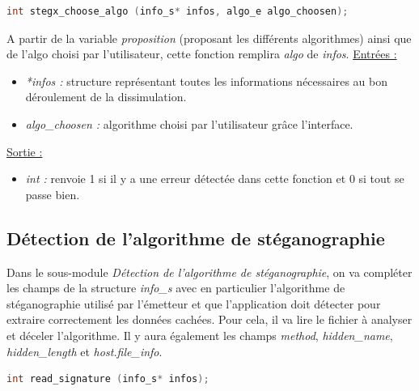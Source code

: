\documentclass[11pt]{article}
\begin{document}
\begin{lstlisting}[language=c]
int stegx_choose_algo (info_s* infos, algo_e algo_choosen); 
\end{lstlisting}

A partir de la variable \textit{proposition} (proposant les différents algorithmes)
ainsi que de l'algo choisi par l'utilisateur, cette fonction remplira 
\textit{algo} de \textit{infos}. 
\newline
\underline{Entrées :}
\begin{itemize}
\item \textit{*infos :} structure représentant toutes les informations 
nécessaires au bon déroulement de la dissimulation. 
\item \textit{algo\_choosen :} algorithme choisi par l'utilisateur grâce
l'interface.
\end{itemize}
\underline{Sortie :} 
\begin{itemize}
\item \textit{int :} renvoie 1 si il y a une erreur détectée dans cette 
fonction et 0 si tout se passe bien.  
\newline 
\end{itemize}

\subsection{Détection de l'algorithme de stéganographie}

Dans le sous-module \textit{Détection de l'algorithme de stéganographie}, 
on va compléter les champs de la structure \textit{info\_s} avec en particulier 
l'algorithme de stéganographie utilisé par l'émetteur et que l'application 
doit détecter pour extraire correctement les données cachées. Pour cela, 
il va lire le fichier à analyser et déceler l'algorithme. Il y aura également 
les champs \textit{method}, \textit{hidden\_name}, \textit{hidden\_length}
et \textit{host.file\_info}.\newline

\begin{lstlisting}[language=c]
int read_signature (info_s* infos); 
\end{lstlisting}
\end{document}
